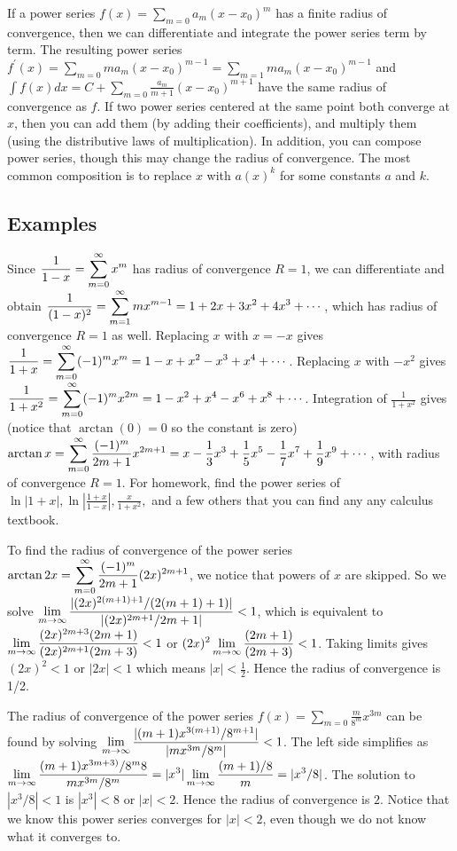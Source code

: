 If a power series $f(x)= \sum_{m=0}a_m (x-x_0)^m$ has a finite radius of convergence, then we can differentiate and integrate the power series term by term. The resulting power series $f^\prime (x) = \sum_{m=0}m a_m (x-x_0)^{m-1}=\sum_{m=1}m a_m (x-x_0)^{m-1} $ and $\int f(x)dx = C+\sum_{m=0}\frac{a_m}{m+1} (x-x_0)^{m+1}$ have the same radius of convergence as $f$.  If two power series centered at the same point both converge at $x$, then you can add them (by adding their coefficients), and multiply them (using the distributive laws of multiplication). In addition, you can compose power series, though this may change the radius of convergence.  The most common composition is to replace $x$ with $a(x)^k$ for some constants $a$ and $k$. 

\subsection{Examples}
Since $\displaystyle \frac{1}{1-x} = \sum_{m=0}^\infty x^m$ has radius of convergence $R=1$, we can differentiate and obtain $\displaystyle \frac{1}{(1-x)^2} = \sum_{m=1}^\infty m x^{m-1} = 1+2x+3x^2+4x^3+\cdots$, which has radius of convergence $R=1$ as well.  Replacing $x$ with $x=-x$ gives $\displaystyle \frac{1}{1+x} = \sum_{m=0}^\infty (-1)^m x^m = 1-x+x^2-x^3+x^4+\cdots$. Replacing $x$ with $-x^2$ gives $\displaystyle \frac{1}{1+x^2} = \sum_{m=0}^\infty (-1)^m x^{2m} = 1-x^2+x^4-x^6+x^8+\cdots$. Integration of $\frac{1}{1+x^2}$ gives (notice that $\arctan(0)=0$ so the constant is zero) $\arctan x = \displaystyle \sum_{m=0}^\infty \frac{(-1)^m}{2m+1} x^{2m+1} = x-\frac13x^3+\frac15x^5-\frac17x^7+\frac19x^9+\cdots$, with radius of convergence $R=1$. For homework, find the power series of $\ln|1+x|,\ln\left|\frac{1+x}{1-x}\right|,\frac{x}{1+x^2},$ and a few others that you can find any any calculus textbook.  

To find the radius of convergence of the power series $\arctan 2x = \displaystyle \sum_{m=0}^\infty \frac{(-1)^m}{2m+1} (2x)^{2m+1}$, we notice that powers of $x$ are skipped. So we solve 
$\displaystyle \lim_{m\to\infty}\frac{|(2x)^{2(m+1)+1}/(2(m+1)+1)|}{|(2x)^{2m+1}/2m+1|}<1$, 
which is equivalent to 
$\displaystyle \lim_{m\to\infty}\frac{(2x)^{2m+3}(2m+1)}{(2x)^{2m+1}(2m+3)}<1$ or
$\displaystyle (2x)^2 \lim_{m\to\infty}\frac{(2m+1)}{(2m+3)}<1$. Taking limits gives $(2x)^2<1$ or $|2x|<1$ which means $|x|<\frac{1}{2}$. Hence the radius of convergence is 1/2.  

The radius of convergence of the power series $f(x) = \sum_{m=0}\frac{m}{8^m} x^{3m}$ can be found by solving 
$\displaystyle \lim_{m\to\infty}\frac{|(m+1)x^{3(m+1)}/8^{m+1}|}{|mx^{3m}/8^{m}|}<1$. The left side simplifies as 
$\displaystyle \lim_{m\to\infty}\frac{(m+1)x^{3m+3)}/8^{m}8}{mx^{3m}/8^{m}} = |x^3|\lim_{m\to\infty}\frac{(m+1)/8}{m} =|x^3/8|$.  The solution to $|x^3/8|<1$ is $|x^3|<8$ or $|x|<2$.  Hence the radius of convergence is $2$. Notice that we know this power series converges for $|x|<2$, even though we do not know what it converges to.   

